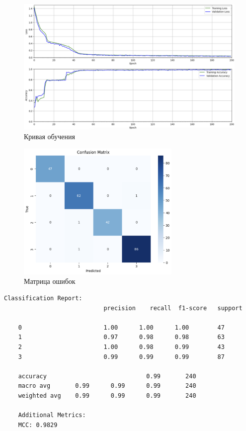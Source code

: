 \begin{figure}
	\begin{center}
		\includegraphics[width=\textwidth]{images/14.png}
	\end{center}
	\caption{Кривая обучения}
	\label{img:14}
\end{figure}

\begin{figure}
	\begin{center}
		\includegraphics[width=0.7\textwidth]{images/15.png}
	\end{center}
	\caption{Матрица ошибок}
	\label{img:15}
\end{figure}

\begin{lstlisting}[label=lst:4,caption=Отчёт по результатам классификации]
	Classification Report:
							precision    recall  f1-score   support
	
	0       				1.00      1.00      1.00        47
	1       				0.97      0.98      0.98        63
	2       				1.00      0.98      0.99        43
	3       				0.99      0.99      0.99        87
	
	accuracy                            0.99       240
	macro avg     	0.99      0.99      0.99       240
	weighted avg    0.99      0.99      0.99       240
	
	Additional Metrics:
	MCC: 0.9829
\end{lstlisting}

